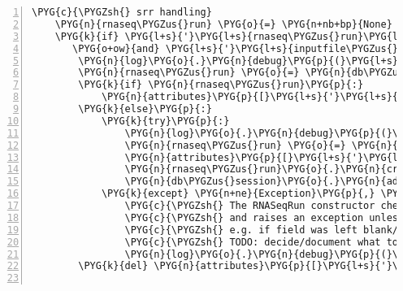 \begin{Verbatim}[commandchars=\\\{\},numbers=left,firstnumber=1,stepnumber=5]
    \PYG{c}{\PYGZsh{} srr handling}
    \PYG{n}{rnaseq\PYGZus{}run} \PYG{o}{=} \PYG{n+nb+bp}{None}
    \PYG{k}{if} \PYG{l+s}{'}\PYG{l+s}{rnaseq\PYGZus{}run}\PYG{l+s}{'} \PYG{o+ow}{in} \PYG{n}{attributes} \PYGZbs{}
       \PYG{o+ow}{and} \PYG{l+s}{'}\PYG{l+s}{inputfile\PYGZus{}name}\PYG{l+s}{'} \PYG{o+ow}{not} \PYG{o+ow}{in} \PYG{n}{attributes}\PYG{p}{:}
        \PYG{n}{log}\PYG{o}{.}\PYG{n}{debug}\PYG{p}{(}\PYG{l+s}{"}\PYG{l+s}{rnaseq\PYGZus{}run: }\PYG{l+s+si}{\PYGZpc{}s}\PYG{l+s}{"} \PYG{o}{\PYGZpc{}} \PYG{n}{attributes}\PYG{p}{[}\PYG{l+s}{'}\PYG{l+s}{rnaseq\PYGZus{}run}\PYG{l+s}{'}\PYG{p}{]}\PYG{p}{)}
        \PYG{n}{rnaseq\PYGZus{}run} \PYG{o}{=} \PYG{n}{db\PYGZus{}session}\PYG{o}{.}\PYG{n}{query}\PYG{p}{(}\PYG{n}{RNASeqRun}\PYG{p}{)}\PYG{o}{.}\PYG{n}{get}\PYG{p}{(}\PYG{n}{attributes}\PYG{p}{[}\PYG{l+s}{'}\PYG{l+s}{rnaseq\PYGZus{}run}\PYG{l+s}{'}\PYG{p}{]}\PYG{p}{)}
        \PYG{k}{if} \PYG{n}{rnaseq\PYGZus{}run}\PYG{p}{:}
            \PYG{n}{attributes}\PYG{p}{[}\PYG{l+s}{'}\PYG{l+s}{rnaseq\PYGZus{}run}\PYG{l+s}{'}\PYG{p}{]} \PYG{o}{=} \PYG{n}{rnaseq\PYGZus{}run}
        \PYG{k}{else}\PYG{p}{:}
            \PYG{k}{try}\PYG{p}{:}
                \PYG{n}{log}\PYG{o}{.}\PYG{n}{debug}\PYG{p}{(}\PYG{l+s}{"}\PYG{l+s}{creating new RNASeqRun}\PYG{l+s}{"}\PYG{p}{)}
                \PYG{n}{rnaseq\PYGZus{}run} \PYG{o}{=} \PYG{n}{RNASeqRun}\PYG{p}{(}\PYG{n}{srr}\PYG{o}{=}\PYG{n}{attributes}\PYG{p}{[}\PYG{l+s}{'}\PYG{l+s}{rnaseq\PYGZus{}run}\PYG{l+s}{'}\PYG{p}{]}\PYG{p}{)}
                \PYG{n}{attributes}\PYG{p}{[}\PYG{l+s}{'}\PYG{l+s}{rnaseq\PYGZus{}run}\PYG{l+s}{'}\PYG{p}{]} \PYG{o}{=} \PYG{n}{rnaseq\PYGZus{}run}
                \PYG{n}{rnaseq\PYGZus{}run}\PYG{o}{.}\PYG{n}{create\PYGZus{}directories}\PYG{p}{(}\PYG{p}{)}
                \PYG{n}{db\PYGZus{}session}\PYG{o}{.}\PYG{n}{add}\PYG{p}{(}\PYG{n}{rnaseq\PYGZus{}run}\PYG{p}{)}
            \PYG{k}{except} \PYG{n+ne}{Exception}\PYG{p}{,} \PYG{n}{e}\PYG{p}{:}
                \PYG{c}{\PYGZsh{} The RNASeqRun constructor checks the SRRnnnnnn argument}
                \PYG{c}{\PYGZsh{} and raises an exception unless it passes the checks}
                \PYG{c}{\PYGZsh{} e.g. if field was left blank/at default value}
                \PYG{c}{\PYGZsh{} TODO: decide/document what to do}
                \PYG{n}{log}\PYG{o}{.}\PYG{n}{debug}\PYG{p}{(}\PYG{l+s}{"}\PYG{l+s}{failed: }\PYG{l+s+si}{\PYGZpc{}r}\PYG{l+s}{"} \PYG{o}{\PYGZpc{}} \PYG{n}{e}\PYG{p}{)}
        \PYG{k}{del} \PYG{n}{attributes}\PYG{p}{[}\PYG{l+s}{'}\PYG{l+s}{rnaseq\PYGZus{}run}\PYG{l+s}{'}\PYG{p}{]}


\end{Verbatim}
